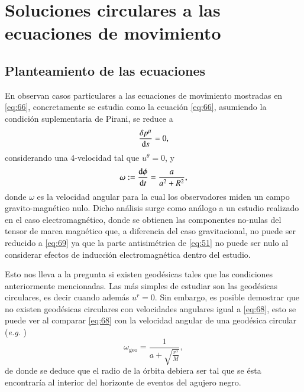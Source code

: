 \chapter{Soluciones circulares a las ecuaciones de movimiento}
\label{cap:4}
\newpage

\section{Planteamiento de las ecuaciones}

En \cite{Costa-Natario-Zilhao} observan casos particulares a las ecuaciones de movimiento mostradas en \eqref{eq:66}, concretamente se estudia como la ecuación \eqref{eq:66}, asumiendo la condición suplementaria de Pirani, se reduce a 
\begin{equation}
\label{eq:69}
\frac{\delta p^{\mu}}{\mathrm{d}s} = 0,
\end{equation}
considerando una 4-velocidad tal que $u^{\theta}=0$, y 
\begin{equation}
\label{eq:68}
\omega := \dv{\phi}{t} = \frac{a}{a^2 + R^2},
\end{equation}
donde $\omega$ es la velocidad angular para la cual los observadores miden un campo gravito-magnético nulo. Dicho análisis surge como análogo a un estudio realizado en el caso electromagnético, donde se obtienen las componentes no-nulas del tensor de marea magnético que, a diferencia del caso gravitacional, no puede ser reducido a \eqref{eq:69} ya que la parte antisimétrica de \eqref{eq:51} no puede ser nulo al considerar efectos de inducción electromagnética dentro del estudio.

Esto nos lleva a la pregunta si existen geodésicas tales que las condiciones anteriormente mencionadas. Las más simples de estudiar son las geodésicas circulares, es decir cuando además $u^r=0$. Sin embargo, es posible demostrar que no existen geodésicas circulares con velocidades angulares igual a \eqref{eq:68}, esto se puede ver al comparar \eqref{eq:68} con la velocidad angular de una geodésica circular (\textit{e.g.} \cite{Matolcsi})
\begin{equation}
\omega_{\mathrm{geo}} = \frac{1}{a + \sqrt{\frac{r^3}{M}}},
\end{equation}
de donde se deduce que el radio de la órbita debiera ser tal que se ésta encontraría al interior del horizonte de eventos del agujero negro.

